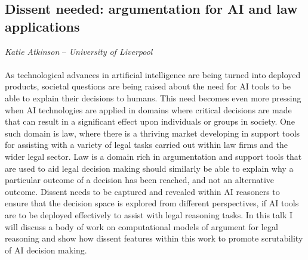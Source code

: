 \subsection*{Dissent needed: argumentation for AI and law applications}
\emph{Katie Atkinson} -- \emph{University of Liverpool}
\\\\
As technological advances in artificial intelligence are being turned into deployed products, societal questions are being raised about the need for AI tools to be able to explain their decisions to humans.  This need becomes even more pressing when AI technologies are applied in domains where critical decisions are made that can result in a significant effect upon individuals or groups in society.  One such domain is law, where there is a thriving market developing in support tools for assisting with a variety of legal tasks carried out within law firms and the wider legal sector.  Law is a domain rich in argumentation and support tools that are used to aid legal decision making should similarly be able to explain why a particular outcome of a decision has been reached, and not an alternative outcome.  Dissent needs to be captured and revealed within AI reasoners to ensure that the decision space is explored from different perspectives, if AI tools are to be deployed effectively to assist with legal reasoning tasks.  In this talk I will discuss a body of work on computational models of argument for legal reasoning and show how dissent features within this work to promote scrutability of AI decision making. 

